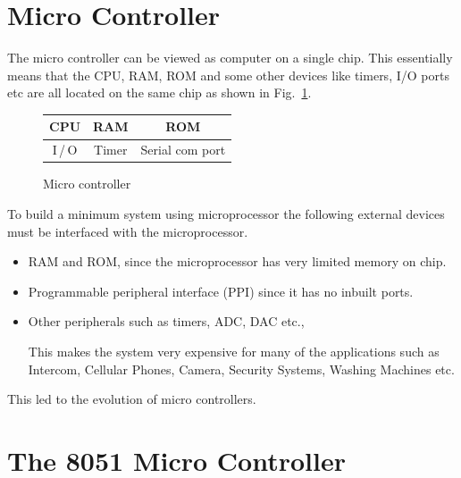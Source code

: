 \section{Micro Controller}\label{sec7.11}

The micro controller can be viewed as computer on a single chip. This essentially means that the CPU, RAM, ROM and some other devices like timers, I/O ports etc are all located on the same chip as shown in Fig.~\ref{fig7.6}.
\begin{figure}[H]
\centering
\caption{Micro controller}\label{fig7.6}
\tabcolsep=10pt
\renewcommand{\arraystretch}{2}
\begin{tabular}{|c|c|c|}
\hline
CPU & RAM & ROM\\
\hline 
I\,/\,O & Timer & Serial com port\\
\hline
\end{tabular}
\end{figure}

\newpage


\smallskip

To build a minimum system using microprocessor the following external devices must be interfaced with the microprocessor.
\begin{itemize}
\item RAM and ROM, since the microprocessor has very limited memory on chip.

\item Programmable peripheral interface (PPI) since it has no inbuilt ports.

\item Other peripherals such as timers, ADC, DAC etc.,  

This makes the system very expensive for many of the applications such as Intercom, Cellular Phones, Camera, Security Systems, Washing Machines etc.
\end{itemize}
This led to the evolution of micro controllers.

\section{The 8051 Micro Controller}\label{sec7.12}

